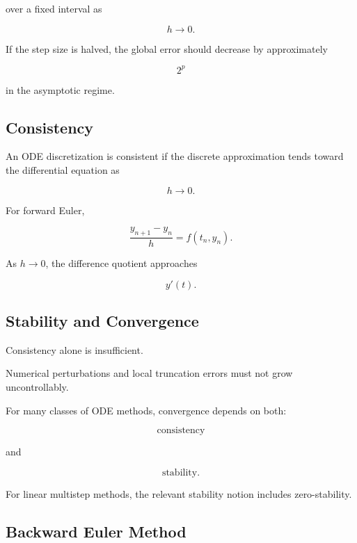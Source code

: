 over a fixed interval as

\[
h\to0.
\]

If the step size is halved, the global error should decrease by
approximately

\[
\boxed{
2^p
}
\]

in the asymptotic regime.

\subsection{Consistency}
\label{subsec:ode-consistency}

An ODE discretization is consistent if the discrete approximation tends
toward the differential equation as

\[
h\to0.
\]

For forward Euler,

\[
\frac{
y_{n+1}-y_n
}{
h
}
=
f(t_n,y_n).
\]

As \(h\to0\), the difference quotient approaches

\[
y'(t).
\]

\subsection{Stability and Convergence}
\label{subsec:ode-stability-convergence}

Consistency alone is insufficient.

Numerical perturbations and local truncation errors must not grow
uncontrollably.

For many classes of ODE methods, convergence depends on both:

\[
\boxed{
\text{consistency}
}
\]

and

\[
\boxed{
\text{stability}.
}
\]

For linear multistep methods, the relevant stability notion includes
zero-stability.

\subsection{Backward Euler Method}
\label{subsec:backward-euler}


